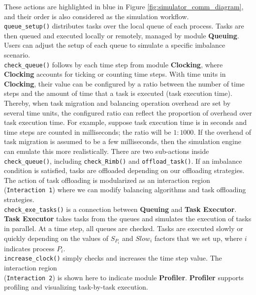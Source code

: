 These actions are highlighted in blue in Figure \ref{fig:simulator_comm_diagram}, and their order is also considered as the simulation workflow.\\

\texttt{queue\_setup()} distributes tasks over the local queue of each process. Tasks are then queued and executed locally or remotely, managed by module \textbf{Queuing}. Users can adjust the setup of each queue to simulate a specific imbalance scenario.\\
	
\texttt{check\_queue()} follows by each time step from module \textbf{Clocking}, where \textbf{Clocking} accounts for ticking or counting time steps. With time units in \textbf{Clocking}, their value can be configured by a ratio between the number of time steps and the amount of time that a task is executed (task execution time). Thereby, when task migration and balancing operation overhead are set by several time units, the configured ratio can reflect the proportion of overhead over task execution time. For example, suppose task execution time is in seconds and time steps are counted in milliseconds; the ratio will be $1:1000$. If the overhead of task migration is assumed to be a few milliseconds, then the simulation engine can emulate this more realistically. There are two sub-actions inside \texttt{check\_queue()}, including \texttt{check\_Rimb()} and \texttt{offload\_task()}. If an imbalance condition is satisfied, tasks are offloaded depending on our offloading strategies. The action of task offloading is modularized as an interaction region (\texttt{Interaction 1}) where we can modify balancing algorithms and task offloading strategies.\\
	
\texttt{check\_exe\_tasks()} is a connection between \textbf{Queuing} and \textbf{Task Executor}. \textbf{Task Executor} takes tasks from the queues and simulates the execution of tasks in parallel. At a time step, all queues are checked. Tasks are executed slowly or quickly depending on the values of $S_{P_{i}}$ and $Slow_{i}$ factors that we set up, where $i$ indicates process $P_{i}$.\\
	
\texttt{increase\_clock()} simply checks and increases the time step value. The interaction region \\ (\texttt{Interaction 2}) is shown here to indicate module \textbf{Profiler}. \textbf{Profiler} supports profiling and visualizing task-by-task execution.\\

